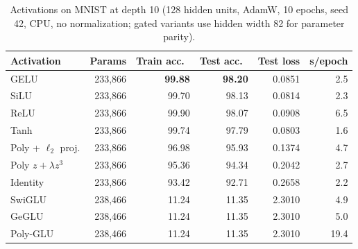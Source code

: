 \begin{table}[t]
\centering
\caption{Activations on MNIST at depth 10 (128 hidden units, AdamW, 10 epochs, seed 42, CPU, no normalization; gated variants use hidden width 82 for parameter parity).}
\label{tab:activation}
\small
\begin{tabular}{lrrrrr}
\toprule
Activation & Params & Train acc.\ & Test acc.\ & Test loss & s/epoch \\
\midrule
GELU & 233,866 & \textbf{99.88} & \textbf{98.20} & 0.0851 & 2.5 \\
SiLU & 233,866 & 99.70 & 98.13 & 0.0814 & 2.3 \\
ReLU & 233,866 & 99.90 & 98.07 & 0.0908 & 6.5 \\
Tanh & 233,866 & 99.74 & 97.79 & 0.0803 & 1.6 \\
Poly + $\ell_2$ proj. & 233,866 & 96.98 & 95.93 & 0.1374 & 4.7 \\
Poly $z+\lambda z^3$ & 233,866 & 95.36 & 94.34 & 0.2042 & 2.7 \\
Identity & 233,866 & 93.42 & 92.71 & 0.2658 & 2.2 \\
SwiGLU & 238,466 & 11.24 & 11.35 & 2.3010 & 4.9 \\
GeGLU & 238,466 & 11.24 & 11.35 & 2.3010 & 5.0 \\
Poly-GLU & 238,466 & 11.24 & 11.35 & 2.3010 & 19.4 \\
\bottomrule
\end{tabular}
\end{table}